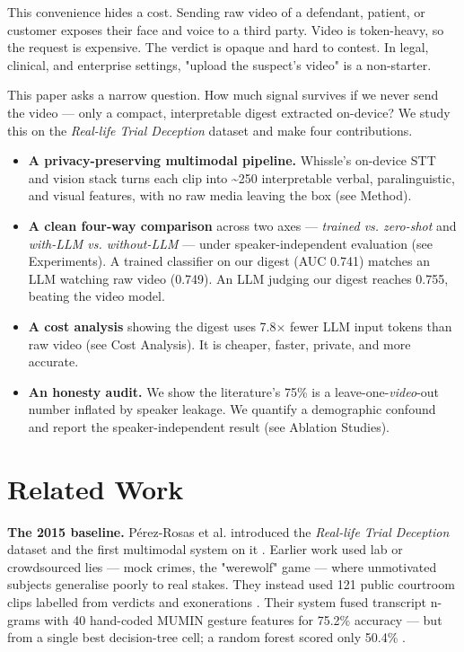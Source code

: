 \documentclass[11pt]{article}
\begin{document}
This convenience hides a cost. Sending raw video of a defendant, patient, or customer exposes their face and voice to a third party. Video is token-heavy, so the request is expensive. The verdict is opaque and hard to contest. In legal, clinical, and enterprise settings, "upload the suspect's video" is a non-starter.

This paper asks a narrow question. How much signal survives if we never send the video --- only a compact, interpretable digest extracted on-device? We study this on the \emph{Real-life Trial Deception} dataset \cite{ref1} and make four contributions.

\begin{itemize}
  \item \textbf{A privacy-preserving multimodal pipeline.} Whissle's on-device STT and vision stack turns each clip into \textasciitilde{}250 interpretable verbal, paralinguistic, and visual features, with no raw media leaving the box (see Method).
  \item \textbf{A clean four-way comparison} across two axes --- \emph{trained vs. zero-shot} and \emph{with-LLM vs. without-LLM} --- under speaker-independent evaluation (see Experiments). A trained classifier on our digest (AUC 0.741) matches an LLM watching raw video (0.749). An LLM judging our digest reaches 0.755, beating the video model.
  \item \textbf{A cost analysis} showing the digest uses 7.8$\times$ fewer LLM input tokens than raw video (see Cost Analysis). It is cheaper, faster, private, and more accurate.
  \item \textbf{An honesty audit.} We show the literature's 75\% is a leave-one-\emph{video}-out number inflated by speaker leakage. We quantify a demographic confound and report the speaker-independent result (see Ablation Studies).
\end{itemize}

\section{Related Work}

\textbf{The 2015 baseline.} Pérez-Rosas et al. introduced the \emph{Real-life Trial Deception} dataset and the first multimodal system on it \cite{ref1}. Earlier work used lab or crowdsourced lies --- mock crimes, the "werewolf" game \cite{ref4} --- where unmotivated subjects generalise poorly to real stakes. They instead used 121 public courtroom clips labelled from verdicts and exonerations \cite{ref1}. Their system fused transcript n-grams with 40 hand-coded MUMIN gesture features for 75.2\% accuracy --- but from a single best decision-tree cell; a random forest scored only 50.4\% \cite{ref1}.
\end{document}
